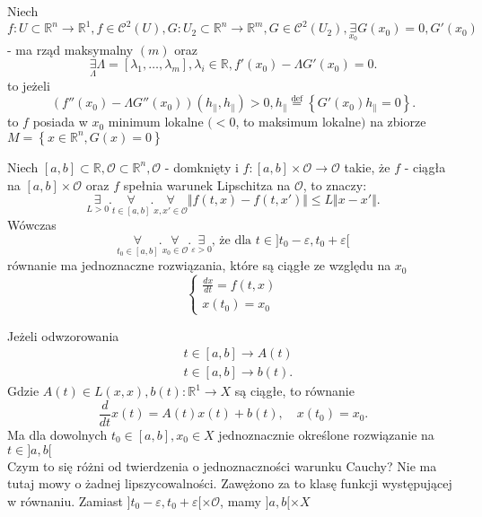 \documentclass{article}
\begin{document}
\newtheorem{obserwacja}{Obserwacja}
\newtheorem{dowod}{Dowód}
\newtheorem{przyklad}{Przykład}
\newtheorem{pytanie}{Pytanie}
\newtheorem{uwaga}{Uwaga}
\begin{tw}
Niech $f:U\subset \mathbb{R}^n \to \mathbb{R}^1, f\in \mathcal{C}^2(U), G: U_2\subset\mathbb{R}^n\to\mathbb{R}^m, G\in \mathcal{C}^2(U_2), \underset{x_0}{\exists} G(x_0) = 0, G'(x_0)$ - ma rząd maksymalny $(m)$ oraz \[\underset{\Lambda}{\exists} \Lambda = \left[ \lambda_1,\ldots,\lambda_m \right], \lambda_i \in \mathbb{R}, f'(x_0) - \Lambda G'(x_0) = 0.\] to jeżeli\[(f''(x_0)-\Lambda G''(x_0))(h_\parallel,h_\parallel) > 0,h_\parallel \overset{\text{def}}{=} \left \{G'(x_0) h_\parallel = 0 \right \}.\] to $f$ posiada w $x_0$ minimum lokalne $(<0$, to maksimum lokalne$)$ na zbiorze $M = \left\{ x\in \mathbb{R}^n, G(x) = 0 \right\} $\end{tw}
\begin{tw}
    Niech $[a,b] \subset \mathbb{R}, \mathcal{O}\subset\mathbb{R}^n, \mathcal{O}$ - domknięty i $f:[a,b]\times\mathcal{O}\to\mathcal{O}$ takie, że $f$ - ciągła na $[a,b]\times\mathcal{O}$ oraz $f$ spełnia warunek Lipschitza na $\mathcal{O}$, to znaczy:\[\underset{L>0}{\exists}. \underset{t\in[a,b]}{\forall}. \underset{x,x'\in\mathcal{O}}{\forall} \Vert f(t,x) - f(t,x') \Vert \leq L \Vert x-x' \Vert.\] Wówczas \[\underset{t_0\in[a,b]}{\forall} . \underset{x_0\in\mathcal{O}}{\forall} . \underset{\varepsilon>0}{\exists} \text{, że dla } t\in ]t_0-\varepsilon, t_0+\varepsilon[\]równanie ma jednoznaczne rozwiązania, które są ciągłe ze względu na $x_0$\begin{equation}\begin{cases}\label{eq:eq21}\frac{dx}{dt} = f(t,x)\\x(t_0) = x_0\end{cases}\end{equation}\end{tw}
\begin{tw}
    Jeżeli odwzorowania\begin{align*}&t\in [a,b]\to A(t)\\&t\in [a,b]\to b(t).\end{align*}Gdzie $A(t)\in L(x,x), b(t) : \mathbb{R}^1\to X$ są ciągłe, to równanie\[\frac{d}{dt}x(t) = A(t)x(t) + b(t),\quad x(t_0) = x_0.\]Ma dla dowolnych $t_0\in[a,b], x_0\in X$ jednoznacznie określone rozwiązanie na $t\in]a,b[$\\Czym to się różni od twierdzenia o jednoznaczności warunku Cauchy? Nie ma tutaj mowy o żadnej lipszycowalności. Zawężono za to klasę funkcji występującej w równaniu. Zamiast $]t_0-\varepsilon,t_0+\varepsilon[\times \mathcal{O}$, mamy $]a,b[ \times X$\end{tw}
\end{document}
